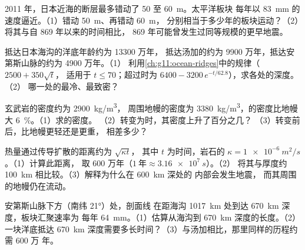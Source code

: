 \begin{exercise}[$\star\star$]\label{exo:g11:subduction-zones:9}
2011 年，日本近海的断层最多错动了 50 至 \qty{60}{m}。太平洋板块
每年以 \qty{83}{mm} 的速度逼近。（1）错动 \qty{50}{m}、再错动 \qty{60}{m}，
分别相当于多少年的板块运动？（2）将其与自 869 年以来的时间相比，
869 年可能曾发生过同等规模的更早地震。
\end{exercise}

\begin{exercise}[$\star\star$]\label{exo:g11:subduction-zones:10}
抵达日本海沟的洋底年龄约为 13300 万年，
抵达汤加的约为 9900 万年，抵达安第斯山脉的约为 4900 万年。（1）
利用\cref{ch:g11:ocean-ridges}中的规律（$2500 + 350\sqrt{t}$，
适用于 $t \le 70$；超过时为 $6400 - 3200\,e^{-t/62.8}$），求各处的深度。（2）
哪一处的最冷、最致密？
\end{exercise}

\begin{exercise}[$\star\star$]\label{exo:g11:subduction-zones:11}
玄武岩的密度约为 \qty{2900}{kg/m^3}，
周围地幔的密度为 \qty{3380}{kg/m^3}，的密度比地幔大
\qty{6}{\percent}。（1）求的密度。
（2）转变为时，其密度上升了百分之几？
（3）转变前后，比地幔更轻还是更重，
相差多少？
\end{exercise}

\begin{exercise}[$\star\star\star$]\label{exo:g11:subduction-zones:12}
热量通过传导扩散的距离约为 $\sqrt{\kappa t}$，
其中 $t$ 为时间，岩石的 $\kappa = \qty{1e-6}{m^2/s}$。（1）计算此距离，
取 600 万年（$1~\text{年} \approx \qty{3.16e7}{s}$）。（2）
将其与厚度约 \qty{100}{km} 相比较。（3）解释为什么在 \qty{600}{km} 深处的
内部会发生地震，
而其周围的地幔仍在流动。
\end{exercise}

\begin{exercise}[$\star\star\star$]\label{exo:g11:subduction-zones:13}
安第斯山脉下方（南纬 \ang{21}）处，剖面线
在距海沟 \qty{1017}{km} 处到达 \qty{670}{km} 深度，板块汇聚速率为
每年 \qty{64}{mm}。（1）估算从海沟到
\qty{670}{km} 深度的长度。（2）一块洋底抵达
\qty{670}{km} 深度需要多长时间？（3）与汤加相比，那里同样的历程约需 600 万
年。
\end{exercise}

